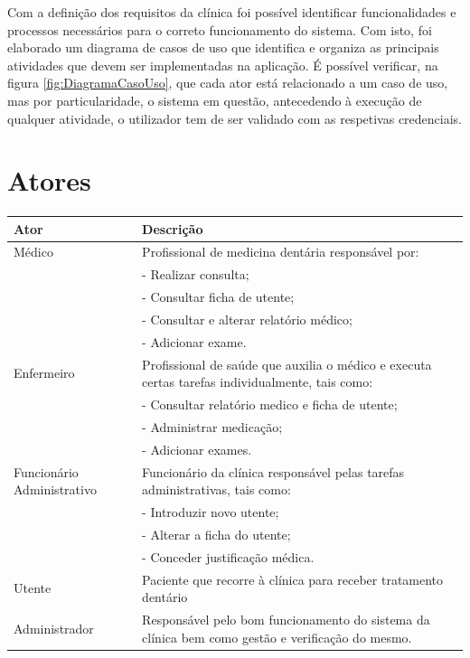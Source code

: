 \documentclass[11pt,a4paper,twoside]{report}
\begin{document}
Com a definição dos requisitos da clínica foi possível identificar funcionalidades e processos necessários para o correto funcionamento do sistema. Com isto, foi elaborado um diagrama de casos de uso que identifica e organiza as principais atividades que devem ser implementadas na aplicação.
É possível verificar, na figura \ref{fig:DiagramaCasoUso}, que cada ator está relacionado a um caso de uso, mas por particularidade, o sistema em questão, antecedendo à execução de qualquer atividade, o utilizador tem de ser validado com as respetivas credenciais. 

\section{Atores}

\paragraph{}
\begin{center}
	\begin{tabularx}{\textwidth}{|l|X|}
	\hline
	Ator & Descrição \\
	\hline
	Médico & Profissional de medicina dentária responsável por: \\
	&- Realizar consulta;  \\
	&- Consultar ficha de utente;   \\
	&- Consultar e alterar relatório médico; \\
	&- Adicionar exame. \\
	\hline
Enfermeiro & Profissional de saúde que auxilia o médico e executa certas tarefas individualmente, tais como: \\
	&- Consultar relatório medico e ficha de utente; \\
	&- Administrar medicação; \\
	&- Adicionar exames. \\
	\hline
Funcionário Administrativo & Funcionário da clínica responsável pelas tarefas administrativas, tais como: \\
	&- Introduzir novo utente; \\
	&- Alterar a ficha do utente; \\
	&- Conceder justificação médica. \\
	\hline
Utente  & 	Paciente que recorre à clínica para receber tratamento dentário \\
\hline
Administrador  & Responsável pelo bom funcionamento do sistema da clínica bem como gestão e verificação do mesmo. \\
\hline
\end{tabularx}
\end{center}
\end{document}
